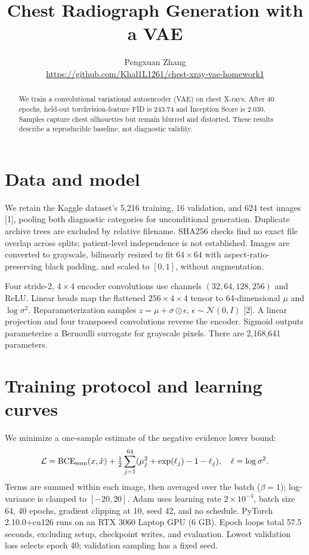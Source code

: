 \documentclass{article}
\title{Chest Radiograph Generation with a VAE}
\author{Pengxuan Zhang\\\small\url{https://github.com/Khal1L1261/chest-xray-vae-homework1}}
\begin{document}
\maketitle
\begin{abstract}
We train a convolutional variational autoencoder (VAE) on chest X-rays. After 40 epochs, held-out torchvision-feature FID is 243.74 and Inception Score is 2.030. Samples capture chest silhouettes but remain blurred and distorted. These results describe a reproducible baseline, not diagnostic validity.
\end{abstract}

\section{Data and model}
We retain the Kaggle dataset's 5,216 training, 16 validation, and 624 test images [1], pooling both diagnostic categories for unconditional generation. Duplicate archive trees are excluded by relative filename. SHA256 checks find no exact file overlap across splits; patient-level independence is not established. Images are converted to grayscale, bilinearly resized to fit $64\times64$ with aspect-ratio-preserving black padding, and scaled to $[0,1]$, without augmentation.

Four stride-2, $4\times4$ encoder convolutions use channels $(32,64,128,256)$ and ReLU. Linear heads map the flattened $256\times4\times4$ tensor to 64-dimensional $\mu$ and $\log\sigma^2$. Reparameterization samples $z=\mu+\sigma\odot\epsilon$, $\epsilon\sim\mathcal N(0,I)$ [2]. A linear projection and four transposed convolutions reverse the encoder. Sigmoid outputs parameterize a Bernoulli surrogate for grayscale pixels. There are 2,168,641 parameters.

\section{Training protocol and learning curves}
We minimize a one-sample estimate of the negative evidence lower bound:
\begin{equation}
\mathcal L=\operatorname{BCE}_{\rm sum}(x,\hat x)
+\tfrac12\sum_{j=1}^{64}(\mu_j^2+\exp(\ell_j)-1-\ell_j),\quad \ell=\log\sigma^2.
\end{equation}
Terms are summed within each image, then averaged over the batch ($\beta=1$); log-variance is clamped to $[-20,20]$. Adam uses learning rate $2\times10^{-4}$, batch size 64, 40 epochs, gradient clipping at 10, seed 42, and no schedule. PyTorch 2.10.0+cu126 runs on an RTX 3060 Laptop GPU (6 GB). Epoch loops total 57.5 seconds, excluding setup, checkpoint writes, and evaluation. Lowest validation loss selects epoch 40; validation sampling has a fixed seed.
\end{document}
